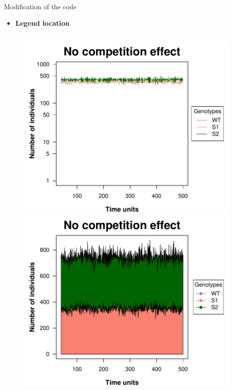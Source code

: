 \begin{frame}{Modification of the code}
\begin{itemize}
        \item \textbf{Legend location}
\end{itemize}
    \begin{columns}
        \begin{figure}
        \begin{column}{0.5\textwidth}
                \includegraphics[width=0.99\linewidth]{img/line_example.pdf}
        \end{column}
        \begin{column}{0.5\textwidth}
                \includegraphics[width=0.99\linewidth]{img/stream_example.pdf}
        \end{column}
        \end{figure}
        
    \end{columns}
\end{frame}
